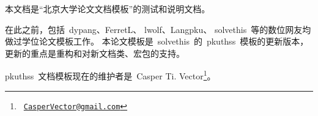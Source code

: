 
本文档是“北京大学论文文档模板”的测试和说明文档。

在此之前，包括~dypang\supercite{dypang}、FerretL\supercite{FerretL}、
lwolf\supercite{lwolf}、Langpku\supercite{Langpku}、
solvethis\supercite{solvethis}~等的数位网友均做过学位论文模板工作。
本论文模板是~solvethis~的~pkuthss~模板的更新版本，
更新的重点是重构和对新文档类、宏包的支持。

pkuthss~文档模板现在的维护者是~Casper Ti. Vector\footnote%
{\ \href{CasperVector@gmail.com}{\texttt{CasperVector@gmail.com}}}。

